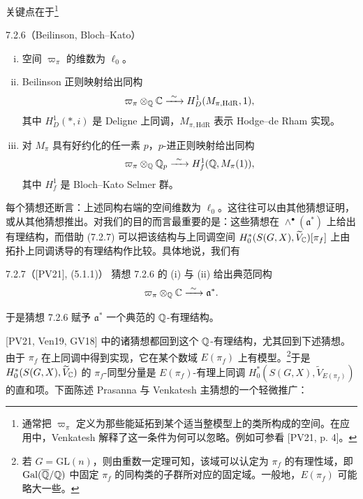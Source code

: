 
关键点在于\footnote{通常把 $\varpi_\pi$ 定义为那些能延拓到某个适当整模型上的类所构成的空间。在应用中，Venkatesh 解释了这一条件为何可以忽略。例如可参看 [PV21, p. 4]。}

\begin{conj}{7.2.6}（Beilinson, Bloch--Kato）\label{thm:a6-05-1}
\begin{enumerate}[(i)]
\item 空间 $\varpi_\pi$ 的维数为 $\ell_0$。
\item Beilinson 正则映射给出同构
\[
\varpi_\pi\otimes_{\mathbb{Q}}\mathbb{C}\xrightarrow{\ \sim\ } H^1_D(M_{\pi,\mathrm{HdR}},1),
\]
其中 $H^1_D(*,i)$ 是 Deligne 上同调，$M_{\pi,\mathrm{HdR}}$ 表示 Hodge--de Rham 实现。
\item 对 $M_\pi$ 具有好约化的任一素 $p$，$p$-进正则映射给出同构
\[
\varpi_\pi\otimes_{\mathbb{Q}}\mathbb{Q}_p\xrightarrow{\ \sim\ } H^1_f(\mathbb{Q},M_\pi(1)),
\]
其中 $H^1_f$ 是 Bloch--Kato Selmer 群。
\end{enumerate}
\end{conj}

每个猜想还断言：上述同构右端的空间维数为 $\ell_0$。这往往可以由其他猜想证明，或从其他猜想推出。对我们的目的而言最重要的是：这些猜想在 $\wedge^\bullet(\mathfrak a^*)$ 上给出有理结构，而借助 (7.2.7) 可以把该结构与上同调空间 $H^*_0(S(G,X),\widetilde V_{\mathbb{C}})[\pi_f]$ 上由拓扑上同调诱导的有理结构作比较。具体地说，我们有

\begin{fact}{7.2.7}（[PV21], (5.1.1)）\label{thm:a6-05-2}
猜想 7.2.6 的 (i) 与 (ii) 给出典范同构
\[
\varpi_\pi\otimes_{\mathbb{Q}}\mathbb{C}\xrightarrow{\ \sim\ }\mathfrak a^*.
\]
\end{fact}

于是猜想 7.2.6 赋予 $\mathfrak a^*$ 一个典范的 $\mathbb{Q}$-有理结构。

[PV21, Ven19, GV18] 中的诸猜想都回到这个 $\mathbb{Q}$-有理结构，尤其回到下述猜想。由于 $\pi_f$ 在上同调中得到实现，它在某个数域 $E(\pi_f)$ 上有模型。\footnote{若 $G=\mathrm{GL}(n)$，则由重数一定理可知，该域可以认定为 $\pi_f$ 的有理性域，即 $\operatorname{Gal}(\overline{\mathbb{Q}}/\mathbb{Q})$ 中固定 $\pi_f$ 的同构类的子群所对应的固定域。一般地，$E(\pi_f)$ 可能略大一些。}于是 $H^*_0(S(G,X),\widetilde V_{\mathbb{C}})$ 的 $\pi_f$-同型分量是 $E(\pi_f)$-有理上同调 $H^*_0(S(G,X),\widetilde V_{E(\pi_f)})$ 的直和项。下面陈述 Prasanna 与 Venkatesh 主猜想的一个轻微推广：

